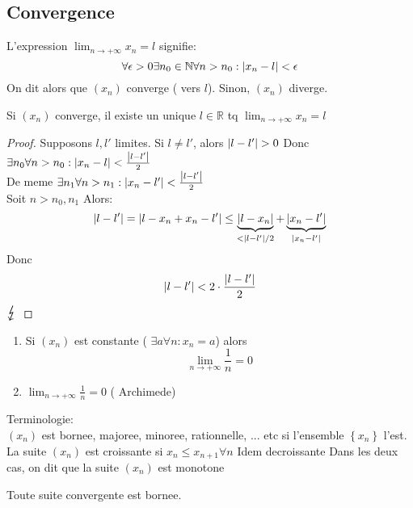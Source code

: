 \documentclass[../main.tex]{subfiles}
\begin{document}
\subsection{Convergence}
\begin{defn}\label{defn:convergence_de_suites}
	L'expression $ \lim_{n \to  + \infty} x_n = l$ signifie:
	\[ 
		\forall \epsilon > 0 \exists n_0 \in \mathbb{N} \forall n>n_0: \left\vert x_n -l\right\vert < \epsilon
	\]
	On dit alors que $(x_n)$ converge ( vers $l$).
	Sinon, $(x_n)$ diverge.
\end{defn}
\begin{lemma}\label{lemma:unicite_de_la_limite}
	Si $(x_n)$ converge, il existe un unique $l \in \mathbb{R}$ tq $ \lim_{n \to  + \infty} x_n =l$
\end{lemma}
\begin{proof}
	Supposons $l,l'$ limites. Si $l \neq l'$, alors $\left\vert l-l'\right\vert > 0$ Donc $\exists n_0 \forall n >n_0: \left\vert x_n -l\right\vert < \frac{\left\vert l-l'\right\vert}{2}$\\
	De meme $\exists n_1 \forall n>n_1: \left\vert x_n - l'\right\vert < \frac{\left\vert l-l'\right\vert}{2}$\\
	Soit $n> n_0,n_1$ Alors:
	\[ 
		\left\vert l-l'\right\vert = \left\vert l-x_n+x_n -l'\right\vert \leq \underbrace{\left\vert l-x_n\right\vert}_{<\left\vert l-l'\right\vert /2} + \underbrace{\left\vert x_n - l'\right\vert}_{\left\vert x_n - l'\right\vert}
	\]
	Donc
	\[ 
		\left\vert l-l'\right\vert < 2 \cdot \frac{\left\vert l-l'\right\vert}{2}
	\]
	$\contra$
\end{proof}
\begin{exemple}
\begin{enumerate}
	\item Si $(x_n)$ est constante ( $\exists a \forall n: x_n =a$) alors 
		\[ 
		\lim_{n \to  + \infty} \frac{1}{n} =0
		\]
	\item $ \lim_{n \to  + \infty} \frac{1}{n} =0$ ( Archimede)
\end{enumerate}

\end{exemple}
\begin{defn}
Terminologie:\\
$(x_n)$ est bornee, majoree, minoree, rationnelle, ... etc si l'ensemble $ \left\{ x_n \right\} $ l'est.
\hr\\
La suite $(x_n)$ est croissante si $x_n \leq x_{n+1} \forall n$ Idem decroissante
Dans les deux cas, on dit que la suite $(x_n)$ est monotone
\end{defn}
\begin{lemma}
Toute suite convergente est bornee.
\end{lemma}
\end{document}
